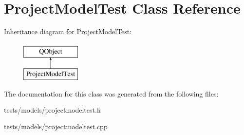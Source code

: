 \hypertarget{classProjectModelTest}{}\section{Project\+Model\+Test Class Reference}
\label{classProjectModelTest}
Inheritance diagram for Project\+Model\+Test\+:\begin{figure}[H]
\begin{center}
\leavevmode
\includegraphics[height=2.000000cm]{dd/d54/classProjectModelTest}
\end{center}
\end{figure}


The documentation for this class was generated from the following files\+:\begin{DoxyCompactItemize}
\item 
tests/models/projectmodeltest.\+h\item 
tests/models/projectmodeltest.\+cpp\end{DoxyCompactItemize}
